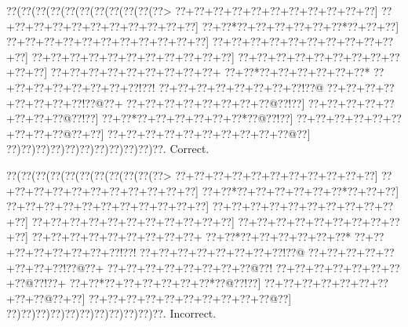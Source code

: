 \documentclass[a5paper]{article}
\begin{document}
\begin{center}
{\goo
\0??(\0??(\0??(\0??(\0??(\0??(\0??(\0??(\0??(\0??(\0??>
\0??+\0??+\0??+\0??+\0??+\0??+\0??+\0??+\0??+\0??+\0??]
\0??+\0??+\0??+\0??+\0??+\0??+\0??+\0??+\0??+\0??+\0??]
\0??+\0??*\0??+\0??+\0??+\0??+\0??+\0??*\0??+\0??+\0??]
\0??+\0??+\0??+\0??+\0??+\0??+\0??+\0??+\0??+\0??+\0??]
\0??+\0??+\0??+\0??+\0??+\0??+\0??+\0??+\0??+\0??+\0??]
\0??+\0??+\0??+\0??+\0??+\0??+\0??+\0??+\0??+\0??+\0??]
\0??+\0??+\0??+\0??+\0??+\0??+\0??+\0??+\0??+\0??+\0??]
\0??+\0??+\0??+\0??+\0??+\0??+\0??+\0??+\0??+
\0??+\0??*\0??+\0??+\0??+\0??+\0??+\0??*
\0??+\0??+\0??+\0??+\0??+\0??+\0??+\0??!\0??!
\0??+\0??+\0??+\0??+\0??+\0??+\0??+\0??!\0??@
\0??+\0??+\0??+\0??+\0??+\0??+\0??+\0??!\0??@\0??+
\0??+\0??+\0??+\0??+\0??+\0??+\0??+\0??@\0??!\0??]
\0??+\0??+\0??+\0??+\0??+\0??+\0??+\0??@\0??!\0??]
\0??+\0??*\0??+\0??+\0??+\0??+\0??+\0??*\0??@\0??!\0??]
\0??+\0??+\0??+\0??+\0??+\0??+\0??+\0??+\0??@\0??+\0??]
\0??+\0??+\0??+\0??+\0??+\0??+\0??+\0??+\0??+\0??@\0??]
\0??)\0??)\0??)\0??)\0??)\0??)\0??)\0??)\0??)\0??)\0??.
}
Correct. 

\end{center}
\begin{center}
{\goo
\0??(\0??(\0??(\0??(\0??(\0??(\0??(\0??(\0??(\0??(\0??>
\0??+\0??+\0??+\0??+\0??+\0??+\0??+\0??+\0??+\0??+\0??]
\0??+\0??+\0??+\0??+\0??+\0??+\0??+\0??+\0??+\0??+\0??]
\0??+\0??*\0??+\0??+\0??+\0??+\0??+\0??*\0??+\0??+\0??]
\0??+\0??+\0??+\0??+\0??+\0??+\0??+\0??+\0??+\0??+\0??]
\0??+\0??+\0??+\0??+\0??+\0??+\0??+\0??+\0??+\0??+\0??]
\0??+\0??+\0??+\0??+\0??+\0??+\0??+\0??+\0??+\0??+\0??]
\0??+\0??+\0??+\0??+\0??+\0??+\0??+\0??+\0??+\0??]
\0??+\0??+\0??+\0??+\0??+\0??+\0??+\0??+\0??+
\0??+\0??*\0??+\0??+\0??+\0??+\0??+\0??*
\0??+\0??+\0??+\0??+\0??+\0??+\0??+\0??!\0??!
\0??+\0??+\0??+\0??+\0??+\0??+\0??+\0??!\0??@
\0??+\0??+\0??+\0??+\0??+\0??+\0??+\0??!\0??@\0??+
\0??+\0??+\0??+\0??+\0??+\0??+\0??+\0??@\0??!
\0??+\0??+\0??+\0??+\0??+\0??+\0??+\0??@\0??!\0??+
\0??+\0??*\0??+\0??+\0??+\0??+\0??+\0??*\0??@\0??!\0??]
\0??+\0??+\0??+\0??+\0??+\0??+\0??+\0??+\0??@\0??+\0??]
\0??+\0??+\0??+\0??+\0??+\0??+\0??+\0??+\0??+\0??@\0??]
\0??)\0??)\0??)\0??)\0??)\0??)\0??)\0??)\0??)\0??)\0??.
}
Incorrect. 

\end{center}
\end{document}
